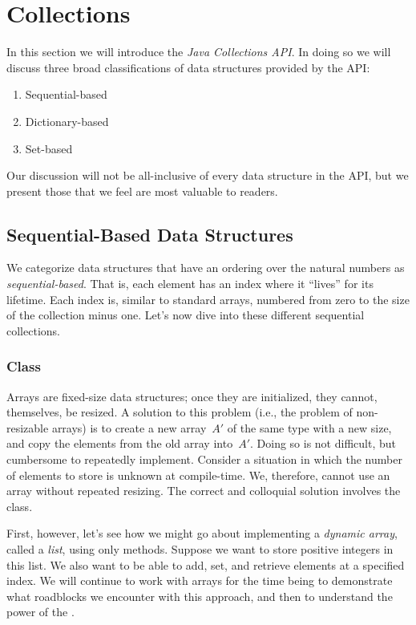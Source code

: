 \section{Collections}
\label{section:chapter-arrays-collections-collections}
In this section we will introduce the \emph{Java Collections API}. In doing so we will discuss three broad classifications of data structures provided by the API:

\begin{enumerate}
    \item Sequential-based
    \item Dictionary-based
    \item Set-based
\end{enumerate}

Our discussion will not be all-inclusive of every data structure in the API, but we present those that we feel are most valuable to readers.

\subsection{Sequential-Based Data Structures}
We categorize data structures that have an ordering over the natural numbers as \emph{sequential-based}. 
That is, each element has an index where it ``lives'' for its lifetime. 
Each index is, similar to standard arrays, numbered from zero to the size of the collection minus one. 
Let's now dive into these different sequential collections.

\subsubsection*{ Class}
Arrays are fixed-size data structures; once they are initialized, they cannot, themselves, be resized. 
A solution to this problem (i.e., the problem of non-resizable arrays) is to create a new array~$A'$ of the same type with a new size, and copy the elements from the old array into~$A'$. 
Doing so is not difficult, but cumbersome to repeatedly implement. 
Consider a situation in which the number of elements to store is unknown at compile-time. 
We, therefore, cannot use an array without repeated resizing. 
The correct and colloquial solution involves the  class.

First, however, let's see how we might go about implementing a \emph{dynamic array}, called a \emph{list}, using only methods. 
Suppose we want to store positive integers in this list. 
We also want to be able to add, set, and retrieve elements at a specified index. 
We will continue to work with arrays for the time being to demonstrate what roadblocks we encounter with this approach, and then to understand the power of the .


